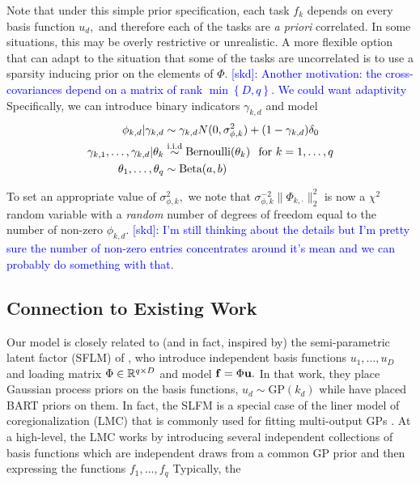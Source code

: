 \documentclass[12pt]{article}
\begin{document}
Note that under this simple prior specification, each task $f_{k}$ depends on every basis function $u_{d},$ and therefore each of the tasks are \textit{a priori} correlated.
In some situations, this may be overly restrictive or unrealistic. 
A more flexible option that can adapt to the situation that some of the tasks are uncorrelated is to use a sparsity inducing prior on the elements of $\Phi.$
\textcolor{blue}{[skd]: Another motivation: the cross-covariances depend on a matrix of rank $\min\left\{D,q\right\}$. We could want adaptivity}
Specifically, we can introduce binary indicators $\gamma_{k,d}$ and model 
\begin{align*}
\phi_{k,d} | \gamma_{k,d} &\sim \gamma_{k,d}N(0,\sigma^{2}_{\phi,k}) + (1 - \gamma_{k,d})\delta_{0} \\
\gamma_{k,1}, \ldots, \gamma_{k,d} | \theta_{k} &\stackrel{\text{i.i.d}}{\sim} \text{Bernoulli}(\theta_{k}) \hspace{0.1in} \text{for $k = 1, \ldots, q$}\\
\theta_{1}, \ldots, \theta_{q} &\sim \text{Beta}(a,b)
\end{align*}

To set an appropriate value of $\sigma^{2}_{\phi,k},$ we note that $\sigma^{-2}_{\phi,k}\lVert \Phi_{k,\cdot} \rVert_{2}^{2}$ is now a $\chi^{2}$ random variable with a \textit{random} number of degrees of freedom equal to the number of non-zero $\phi_{k,d}.$
\textcolor{blue}{[skd]: I'm still thinking about the details but I'm pretty sure the number of non-zero entries concentrates around it's mean and we can probably do something with that.}


\subsection{Connection to Existing Work}
\label{sec:related_work}

Our model is closely related to (and in fact, inspired by) the semi-parametric latent factor (SFLM) of \citet{Teh2004}, who introduce independent basis functions $u_{1}, \ldots, u_{D}$ and loading matrix $\Phi \in \mathbb{R}^{q \times D}$ and model $\mathbf{f} = \Phi \mathbf{u}.$
In that work, they place Gaussian process priors on the basis functions, $u_{d} \sim \text{GP}(k_{d})$ while have placed BART priors on them. 
In fact, the SLFM is a special case of the liner model of coregionalization (LMC) that is commonly used for fitting multi-output GPs \citep[see, e.g.][]{Alvarez2012}.
At a high-level, the LMC works by introducing several independent collections of basis functions which are independent draws from a common GP prior and then expressing the functions $f_{1}, \ldots, f_{q}$ 
Typically, the 
\end{document}

